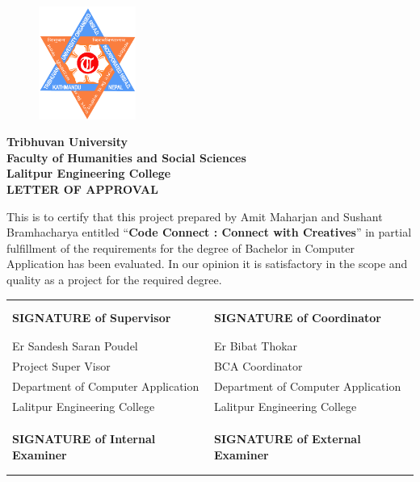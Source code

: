 \begin{figure}
    \centering
    \includegraphics[width=1.25in]{img/Graphics/TUlogo.png}
\end{figure}
\begin{center}
    {\fontsize{14pt}{18}\selectfont
    \textbf{Tribhuvan University\\
    Faculty of Humanities and Social Sciences\\
    Lalitpur Engineering College\\
    \vspace{0.2in}
    LETTER OF APPROVAL\\}
    \vspace{0.2in}}
\end{center}
This is to certify that this project prepared by Amit Maharjan and Sushant Bramhacharya entitled “\textbf{Code Connect :  Connect with Creatives}” in partial fulfillment of the requirements for the degree of Bachelor in Computer Application has been evaluated. In our opinion it is satisfactory in the
scope and quality as a project for the required degree.\\
\begin{center}
    {\fontsize{14pt}{18}\selectfont
    \vspace{0.1in}
    \begin{table}[ht]
        \begin{tabularx}{\textwidth}{|Y|Y|}
        \hline
        &\\
        &\\
        \textbf{SIGNATURE of Supervisor}&\textbf{SIGNATURE of Coordinator}\\
        &\\
        &\\
        Er Sandesh Saran Poudel & Er Bibat Thokar \\
        Project Super Visor & BCA Coordinator \\
        Department of Computer Application & Department of Computer Application\\
        Lalitpur Engineering College & Lalitpur Engineering College \\
        &\\
        &\\
        \hline
        &\\
        \textbf{SIGNATURE of Internal Examiner}&\textbf{SIGNATURE of External Examiner}\\
        &\\
        &\\
        \hline
        \end{tabularx}
        \end{table}
        
    
    }
\end{center}